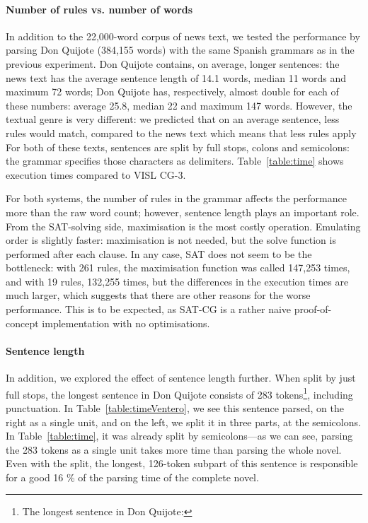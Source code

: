 \paragraph{Number of rules vs. number of words}

In addition to the 22,000-word corpus of news text,
we tested the performance by parsing Don Quijote (384,155 words) with
the same Spanish grammars as in the previous experiment. 
Don Quijote contains, on average, longer sentences: the news text has the average sentence length of 14.1 words, median 11 words and maximum 72 words; Don Quijote has, respectively, almost double for each of these numbers: average 25.8, median 22 and maximum 147 words.
However, the textual genre is very different: we predicted that on an average sentence,
less rules would match, compared to the news text
 which means that less rules apply
For both of these texts, sentences are split by full stops, colons and semicolons: the grammar specifies those characters as delimiters.
Table~\ref{table:time} shows execution times compared to VISL CG-3.


For both systems, the number of rules in the grammar affects the performance 
more than the raw word count; however, sentence length plays an important role.
From the SAT-solving side, maximisation is the most costly operation. 
Emulating order is slightly faster: maximisation is not needed, but
the solve function is performed after each clause.
In any case, SAT does not seem to be the bottleneck: with 261 rules,
the maximisation function was called 147,253 times, and with 19 rules,
132,255 times, but 
the differences in the execution times are much larger, which suggests
that there are other reasons for the worse performance. 
This is to be expected, as SAT-CG is a rather naive
proof-of-concept implementation with no optimisations.

\paragraph{Sentence length} 
In addition, we explored the effect of sentence length further.
When split by just full stops, the longest sentence in Don Quijote consists of 283 tokens\footnote{The longest sentence in Don Quijote: \ventero}, including punctuation. In Table~\ref{table:timeVentero}, we see this sentence parsed, on the right as a single unit, and on the left, we split it in three parts, at the semicolons. In Table~\ref{table:time}, it was already split by semicolons---as we can see, parsing the 283 tokens as a single unit takes more time than parsing the whole novel.
Even with the split, the longest, 126-token subpart of this sentence is responsible for a good 16 \% of the parsing time of the complete novel. 



